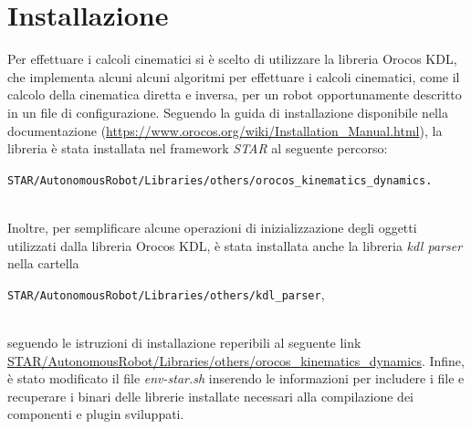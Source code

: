 \section{Installazione}
Per effettuare i calcoli cinematici si è scelto di utilizzare la libreria Orocos KDL, che implementa alcuni alcuni algoritmi per effettuare i calcoli cinematici, come il calcolo della cinematica diretta e inversa, per un robot opportunamente descritto in un file di configurazione. Seguendo la guida di installazione disponibile nella documentazione (\url{https://www.orocos.org/wiki/Installation_Manual.html}), la libreria è stata installata nel framework \textit{STAR} al seguente percorso: \\ 
\centerline{\texttt{STAR/AutonomousRobot/Libraries/others/orocos\_kinematics\_dynamics.}} \\
Inoltre, per semplificare alcune operazioni di inizializzazione degli oggetti utilizzati dalla libreria Orocos KDL, è stata installata anche la libreria \textit{kdl parser} nella cartella \\ \centerline{\texttt{STAR/AutonomousRobot/Libraries/others/kdl\_parser},} \\ seguendo le istruzioni di installazione reperibili al seguente link \url{STAR/AutonomousRobot/Libraries/others/orocos\_kinematics\_dynamics}. Infine, è stato modificato il file \textit{env-star.sh} inserendo le informazioni per includere i file e recuperare i binari delle librerie installate necessari alla compilazione dei componenti e plugin sviluppati.

